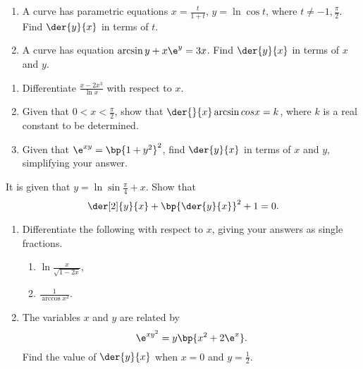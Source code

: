\begin{problem}
    \begin{enumerate}
        \item A curve has parametric equations $x = \frac{t}{1 + t}$, $y = \ln \cos t$, where $t \neq -1, \frac\pi2$. Find $\der{y}{x}$ in terms of $t$.
        \item A curve has equation $\arcsin y + x\e^y = 3x$. Find $\der{y}{x}$ in terms of $x$ and $y$.
    \end{enumerate}
\end{problem}

\begin{problem}
    \begin{enumerate}
        \item Differentiate $\frac{x - 2x^3}{\ln x}$ with respect to $x$.
        \item Given that $0 < x < \frac\pi2$, show that $\der{}{x} \arcsin{cos x} = k$, where $k$ is a real constant to be determined.
        \item Given that $\e^{xy} = \bp{1 + y^2}^2$, find $\der{y}{x}$ in terms of $x$ and $y$, simplifying your answer.
    \end{enumerate}
\end{problem}

\begin{problem}
    It is given that $y = \ln \sin{\frac\pi4 + x}$. Show that \[\der[2]{y}{x} + \bp{\der{y}{x}}^2 + 1 = 0.\]
\end{problem}

\begin{problem}
    \begin{enumerate}
        \item Differentiate the following with respect to $x$, giving your answers as single fractions.
        \begin{enumerate}
            \item $\ln \frac{x}{\sqrt{1 - 2x}}$,
            \item $\frac1{\arccos{x^2}}$.
        \end{enumerate}
        \item The variables $x$ and $y$ are related by \[\e^{xy^2} = y \bp{x^2 + 2\e^x}.\] Find the value of $\der{y}{x}$ when $x = 0$ and $y = \frac12$.
    \end{enumerate}
\end{problem}